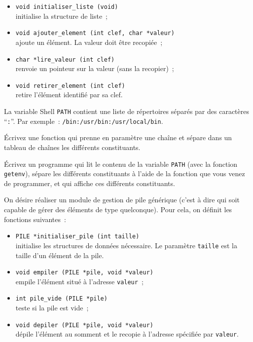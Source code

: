 \begin {itemize}
    \item \verb:void initialiser_liste (void): \\
	initialise la structure de liste~;
    \item \verb:void ajouter_element (int clef, char *valeur): \\
	ajoute un élément. La valeur doit être recopiée~;
    \item \verb:char *lire_valeur (int clef): \\
	renvoie un pointeur sur la valeur (sans la recopier)~;
    \item \verb:void retirer_element (int clef): \\
	retire l'élément identifié par sa clef.
\end {itemize}



\question
    \label {getpath}

La variable Shell {\tt PATH} contient une liste de répertoires séparés
par des caractères ``{\tt :}''.  Par exemple~:
\verb|/bin:/usr/bin:/usr/local/bin|.

Écrivez une fonction qui prenne en paramètre une chaîne et sépare dans
un tableau de chaînes les différents constituants.

Écrivez un programme qui lit le contenu de la variable {\tt PATH}
(avec la fonction {\tt getenv}), sépare les différents constituants à
l'aide de la fonction que vous venez de programmer, et qui affiche
ces différents constituants.


\question

On désire réaliser un module de gestion de pile générique (c'est à dire
qui soit capable de gérer des éléments de type quelconque). Pour cela,
on définit les fonctions suivantes~:

\begin {itemize}
    \item \verb:PILE *initialiser_pile (int taille):\\
	initialise les structures de données nécessaire. Le paramètre
	{\tt taille} est la taille d'un élément de la pile.
    \item \verb:void empiler (PILE *pile, void *valeur):\\
	empile l'élément situé à l'adresse {\tt valeur}~;
    \item \verb:int pile_vide (PILE *pile):\\
	teste si la pile est vide~;
    \item \verb:void depiler (PILE *pile, void *valeur):\\
	dépile l'élément au somment et le recopie à l'adresse spécifiée
	par {\tt valeur}.
\end {itemize}

